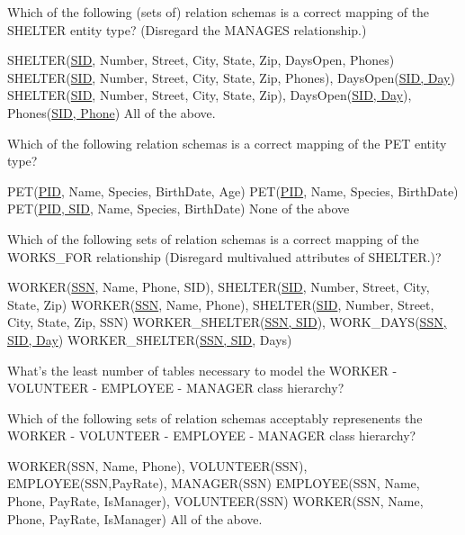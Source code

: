 \documentclass[10pt]{exam}
\begin{document}
\begin{questions}

\question[4] Which of the following (sets of) relation schemas is a correct mapping of the SHELTER entity type? (Disregard the MANAGES relationship.)

\begin{choices}
\choice SHELTER(\underline{SID}, Number, Street, City, State, Zip, DaysOpen, Phones)
\choice SHELTER(\underline{SID}, Number, Street, City, State, Zip, Phones), DaysOpen(\underline{SID, Day})
\correctchoice SHELTER(\underline{SID}, Number, Street, City, State, Zip), DaysOpen(\underline{SID, Day}), Phones(\underline{SID, Phone})
\choice All of the above.
\end{choices}

\question[4] Which of the following relation schemas is a correct mapping of the PET entity type?

\begin{choices}
\choice PET(\underline{PID}, Name, Species, BirthDate, Age)
\choice PET(\underline{PID}, Name, Species, BirthDate)
\correctchoice PET(\underline{PID, SID}, Name, Species, BirthDate)
\choice None of the above
\end{choices}

\question[4] Which of the following sets of relation schemas is a correct mapping of the WORKS\_FOR relationship (Disregard multivalued attributes of SHELTER.)?

\begin{choices}
\choice WORKER(\underline{SSN}, Name, Phone, SID), SHELTER(\underline{SID}, Number, Street, City, State, Zip)
\choice WORKER(\underline{SSN}, Name, Phone), SHELTER(\underline{SID}, Number, Street, City, State, Zip, SSN)
\correctchoice WORKER\_SHELTER(\underline{SSN, SID}), WORK\_DAYS(\underline{SSN, SID, Day})
\choice WORKER\_SHELTER(\underline{SSN, SID}, Days)
\end{choices}

\question[4] What's the least number of tables necessary to model the WORKER - VOLUNTEER - EMPLOYEE - MANAGER class hierarchy?

\begin{choices}
\end{choices}

\question[4] Which of the following sets of relation schemas acceptably represenents the WORKER - VOLUNTEER - EMPLOYEE - MANAGER class hierarchy?

\begin{choices}
\choice WORKER(SSN, Name, Phone), VOLUNTEER(SSN), EMPLOYEE(SSN,PayRate), MANAGER(SSN)
\choice EMPLOYEE(SSN, Name, Phone, PayRate, IsManager), VOLUNTEER(SSN)
\choice WORKER(SSN, Name, Phone, PayRate, IsManager)
\correctchoice All of the above.
\end{choices}



\end{questions}
\end{document}
